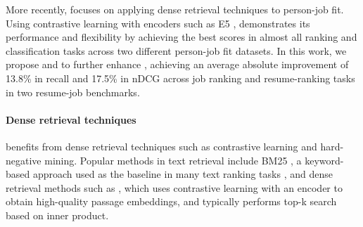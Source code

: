 More recently, \confitold{} \cite{confit_v1} focuses on applying dense retrieval techniques to person-job fit. Using contrastive learning with encoders such as E5 \cite{E5}, \citet{confit_v1} demonstrates its performance and flexibility by achieving the best scores in almost all ranking and classification tasks across two different person-job fit datasets.
In this work, we propose \HyReShort{} and \RunnerUpMiningShort{} to further enhance \framework{}, achieving an average absolute improvement of 13.8\% in recall and 17.5\% in nDCG across job ranking and resume-ranking tasks in two resume-job benchmarks.


\paragraph{Dense retrieval techniques} 
\framework{} benefits from dense retrieval techniques such as contrastive learning \cite{SimCLR,radford2021learning} and hard-negative mining.
Popular methods in text retrieval include BM25 \cite{bm25,bm25-all}, a keyword-based approach used as the baseline in many text ranking tasks \cite{ms-marco,thakur2021beir,muennighoff2022mteb}, and dense retrieval methods such as \citet{DPR,izacard2021contriever,E5,günther2023jina}, which uses contrastive learning with an encoder to obtain high-quality passage embeddings, and typically performs top-k search based on inner product.

